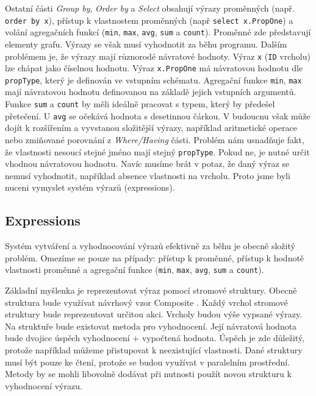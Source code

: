Ostatní části \textit{Group by}, \textit{Order by} a \textit{Select} obsahují výrazy proměnných (např. \texttt{order by x}), přístup k vlastnostem proměnných (např \texttt{select x.PropOne}) a volání agregačních funkcí (\verb+min+, \verb+max+, \verb+avg+, \verb+sum+ a \verb+count+).
Proměnné zde představují elementy grafu.
Výrazy se však musí vyhodnotit za běhu programu.
Dalším problémem je, že výrazy mají různorodé návratové hodnoty.
Výraz \texttt{x} (\verb+ID+ vrcholu) lze chápat jako číselnou hodnotu.
Výraz \texttt{x.PropOne} má návratovou hodnotu dle \verb+propType+, který je definován ve vstupním schématu.
Agregační funkce \verb+min+, \verb+max+ mají návratovou hodnotu definovanou na základě jejich vstupních argumentů.
Funkce \verb+sum+ a \verb+count+ by měli ideálně pracovat s typem, který by předešel přetečení.
U \verb+avg+ se očekává hodnota s desetinnou čárkou.  
V budoucnu však může dojít k rozšířením a vyvstanou složitější výrazy, například aritmetické operace nebo zmiňované porovnání z \textit{Where/Having} části.
Problém nám usnadňuje fakt, že vlastnosti nesoucí stejné jméno mají stejný \verb+propType+.
Pokud ne, je nutné určit vhodnou návratovou hodnotu.
Navíc musíme brát v potaz, že daný výraz se nemusí vyhodnotit, například absence vlastnosti na vrcholu.
Proto jsme byli nuceni vymyslet systém výrazů (expressions).

\subsection{Expressions} \label{anal.expressions}

Systém vytváření a vyhodnocování výrazů efektivně za běhu je obecně složitý problém.
Omezíme se pouze na případy: přístup k proměnné, přístup k hodnotě vlastnosti proměnné a agregační funkce (\verb+min+, \verb+max+, \verb+avg+, \verb+sum+ a \verb+count+).

Základní myšlenka je reprezentovat výraz pomocí stromové struktury.
Obecně struktura bude využívat návrhový vzor Composite \citep[str. 163]{patterns}. 
Každý vrchol stromové struktury bude reprezentovat určitou akci.
Vrcholy budou výše vypsané výrazy. 
Na struktuře bude existovat metoda pro vyhodnocení.
Její návratová hodnota bude dvojice úspěch vyhodnocení + vypočtená hodnota.
Úspěch je zde důležitý, protože například můžeme přistupovat k neexistující vlastnosti. 
Dané struktury musí být pouze ke čtení, protože se budou využívat v paralelním prostřední.
Metody by se mohli libovolně dodávat při nutnosti použít novou strukturu k vyhodnocení výrazu. 

